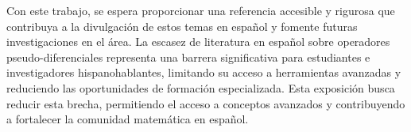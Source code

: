 Con este trabajo, se espera proporcionar una referencia accesible y rigurosa que contribuya a la divulgación de estos temas en español y fomente futuras investigaciones en el área. La escasez de literatura en español sobre operadores pseudo-diferenciales representa una barrera significativa para estudiantes e investigadores hispanohablantes, limitando su acceso a herramientas avanzadas y reduciendo las oportunidades de formación especializada. Esta exposición busca reducir esta brecha, permitiendo el acceso a conceptos avanzados y contribuyendo a fortalecer la comunidad matemática en español.